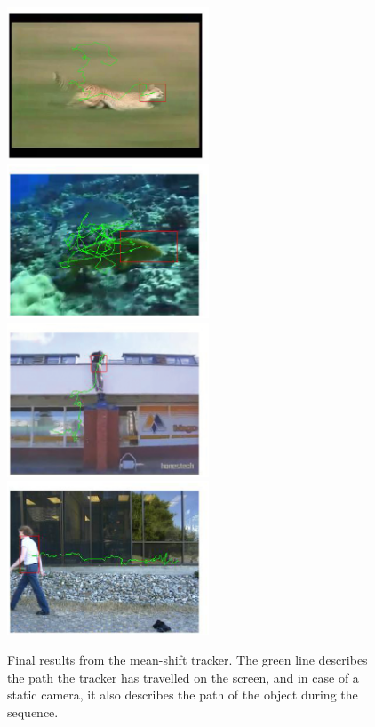\documentclass[a4paper,11pt]{article}
\begin{document}
		\noindent
		\begin{figure}[H]
			\begin{center}
				\includegraphics[width=6cm]{img/res_animal2_hsv.eps} 
				\includegraphics[width=6cm]{img/res_fish2_hue.eps}\\
				\includegraphics[width=6cm]{img/res_freerun1_hue.eps}
				\includegraphics[width=6cm]{img/res_walk1_hsv.eps}\\
			\end{center}
			\caption{
				Final results from the mean-shift tracker. The green line describes the path
				the tracker has travelled on the screen, and in case of a static camera, it
				also describes the path of the object during the sequence.
			}
			\label{fig:RESULTS}
		\end{figure}
\end{document}
